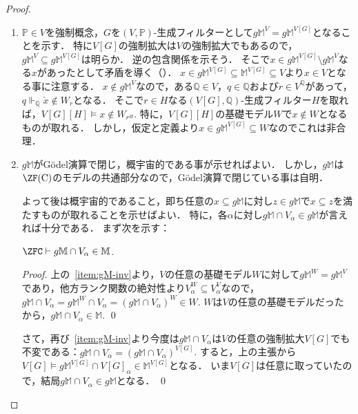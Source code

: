 \documentclass[a4j,leqno]{ltjsarticle}
\renewcommand{\emph}[1]{\textgt{\textsf{#1}}}
\newcommand{\mantle}{\mathbb{M}}
\newcommand{\M}{\mantle}
\newcommand{\gM}{g\mathbb{M}}
\begin{document}
\begin{proof}
 \begin{enumerate}
  \item $\mathbb{P} \in V$を強制概念，$G$を$(V, \mathbb{P})$-生成フィルターとして$\gM^V = \gM^{V[G]}$となることを示す．
        特に$V[G]$の強制拡大は$V$の強制拡大でもあるので，$\gM^{V} \subseteq \gM^{V[G]}$は明らか．
        逆の包含関係を示そう．
        そこで$x \in \gM^{V[G]} \setminus \gM^V$なる$x$があったとして矛盾を導く（\emph{背理法}）．
        $x \in \gM^{V[G]} \subseteq \M^{V[G]} \subseteq V$より$x \in V$となる事に注意する．
        $x \notin \gM^V$なので，ある$\mathbb{Q} \in V$，$q \in \mathbb{Q}$および$\dot{r} \in V^{\mathbb{Q}}$があって，$q \Vdash_{\mathbb{Q}} \check{x} \notin W_{\dot{r}}$となる．
        そこで$r \in H$なる$(V[G], \mathbb{Q})$-生成フィルター$H$を取れば，$V[G][H] \models x \notin W_{r^{H}}$.
        特に，$V[G][H]$の基礎モデル$W$で$x \notin W$となるものが取れる．
        しかし，仮定と定義より$x \in \gM^{V[G]} \subseteq W$なのでこれは非合理．
  \item $\gM$がG\"{o}del演算で閉じ，概宇宙的である事が示せればよい．
        しかし，$\gM$は$\ZF(\mathrm{C})$のモデルの共通部分なので，G\"{o}del演算で閉じている事は自明．

        よって後は概宇宙的であること，即ち任意の$x \subseteq \gM$に対し$z \in \gM$で$x \subseteq z$を満たすものが取れることを示せばよい．
        特に，各$\alpha$に対し$\gM \cap V_\alpha \in \gM$が言えれば十分である．
        まず次を示す：
        \begin{claim}
         $\ZFC \vdash \gM \cap V_\alpha \in \M$.
        \end{claim}
        \begin{proof}
         上の~\ref{item:gM-inv}より，$V$の任意の基礎モデル$W$に対して$\gM^W = \gM^V$であり，他方ランク関数の絶対性より$V_\alpha^W \subseteq V_\alpha^V$なので，$\gM \cap V_\alpha = \gM^W \cap V_\alpha = (\gM \cap V_\alpha)^W \in W$.
         $W$は$V$の任意の基礎モデルだったから，$\gM \cap V_\alpha \in\M $. \qed
        \end{proof}
        さて，再び~\ref{item:gM-inv}より今度は$\gM \cap V_\alpha$は$V$の任意の強制拡大$V[G]$でも不変である：$\gM \cap V_\alpha = (\gM \cap V_\alpha)^{V[G]}$.
        すると，上の主張から$V[G] \models \gM^{V[G]} \cap V[G]_\alpha \in \M^{V[G]}$となる．
        いま$V[G]$は任意に取っていたので，結局$\gM \cap V_\alpha \in \gM$となる． \qed
 \end{enumerate}
\end{proof}
\end{document}
